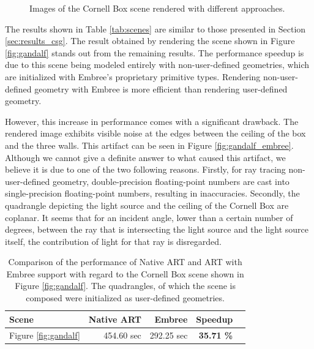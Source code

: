 \begin{figure}
	\hfill
		
	\caption{Images of the Cornell Box scene rendered with different approaches.}
	\label{fig:res_gandalf_issue}
\end{figure}

The results shown in Table \ref{tab:scenes} are similar to those presented in Section \ref{sec:results_csg}. The result obtained by rendering the scene shown in Figure \ref{fig:gandalf} stands out from the remaining results. The performance speedup is due to this scene being modeled entirely with non-user-defined geometries, which are initialized with Embree's proprietary primitive types. Rendering non-user-defined geometry with Embree is more efficient than rendering user-defined geometry.

However, this increase in performance comes with a significant drawback. The rendered image exhibits visible noise at the edges between the ceiling of the box and the three walls. This artifact can be seen in Figure \ref{fig:gandalf_embree}. Although we cannot give a definite answer to what caused this artifact, we believe it is due to one of the two following reasons. Firstly, for ray tracing non-user-defined geometry, double-precision floating-point numbers are cast into single-precision floating-point numbers, resulting in inaccuracies. Secondly, the quadrangle depicting the light source and the ceiling of the Cornell Box are coplanar. It seems that for an incident angle, lower than a certain number of degrees, between the ray that is intersecting the light source and the light source itself, the contribution of light for that ray is disregarded.

\begin{table}
	\centering
	{\footnotesize\sf
		\begin{tabular}{lrrrr}
			\toprule
			Scene  & Native ART & Embree & Speedup \\ 
			\midrule
			Figure \ref{fig:gandalf} & 454.60 sec & 292.25 sec & \textbf{35.71 \%} \\
			\bottomrule
	\end{tabular}}
	\caption{Comparison of the performance of Native ART and ART with Embree support with regard to the Cornell Box scene shown in Figure \ref{fig:gandalf}. The quadrangles, of which the scene is composed were initialized as user-defined geometries.}
	\label{tab:gandalf}
\end{table}


